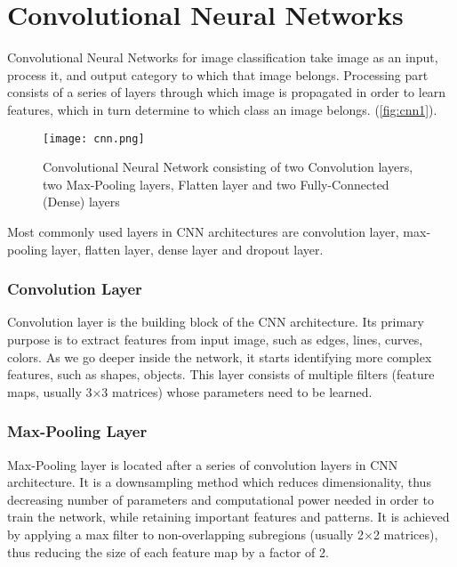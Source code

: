 \chapter{Convolutional Neural Networks} %
\label{appx:simulation}

Convolutional Neural Networks for image classification \cite{krizhevsky2012imagenet} take image as an input, process it, and output category to which that image belongs. Processing part consists of a series of layers through which image is propagated in order to learn features, which in turn determine to which class an image belongs. (\textcolor{red}{\autoref{fig:cnn1}}).

\begin{figure}[h]
	\centering
	\texttt{[image: cnn.png]}
	\caption{Convolutional Neural Network consisting of two Convolution layers, two Max-Pooling layers, Flatten layer and two Fully-Connected (Dense) layers}
	\label{fig:cnn1}
\end{figure}

Most commonly used layers in CNN architectures are convolution layer, max-pooling layer, flatten layer, dense layer and dropout layer.

\subsection{Convolution Layer}

Convolution layer is the building block of the CNN architecture. Its primary purpose is to extract features from input image, such as edges, lines, curves, colors. As we go deeper inside the network, it starts identifying more complex features, such as shapes, objects. This layer consists of multiple filters (feature maps, usually 3$\times$3 matrices) whose parameters need to be learned.
\subsection{Max-Pooling Layer}

Max-Pooling layer is located after a series of convolution layers in CNN architecture. It is a downsampling method which reduces dimensionality, thus decreasing number of parameters and computational power needed in order to train the network, while retaining important features and patterns. It is achieved by applying a max filter to non-overlapping subregions (usually 2$\times$2 matrices), thus reducing the size of each feature map by a factor of 2.

